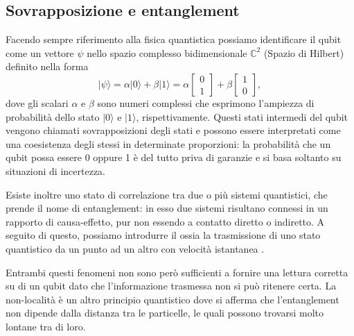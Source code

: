 \subsection{Sovrapposizione e entanglement}
Facendo sempre riferimento alla fisica quantistica possiamo identificare il qubit come un vettore $\psi$ nello spazio complesso bidimensionale $\mathbb{C}^2$ (Spazio di Hilbert) definito nella forma
\begin{equation}
    |\psi\rangle = \alpha|0\rangle + \beta|1\rangle =
    \alpha
    \begin{bmatrix}
        0\\
        1
    \end{bmatrix} +
    \beta
    \begin{bmatrix}
        1\\
        0
    \end{bmatrix},
\end{equation}
dove gli scalari $\alpha$ e $\beta$ sono numeri complessi che esprimono l'ampiezza di probabilità dello stato $|0\rangle$ e $|1\rangle$, rispettivamente.
Questi stati intermedi del qubit vengono chiamati sovrapposizioni degli stati e possono essere interpretati come una coesistenza degli stessi in determinate proporzioni: la probabilità che un qubit possa essere 0 oppure 1 è del tutto priva di garanzie e si basa soltanto su situazioni di incertezza.

Esiste inoltre uno stato di correlazione tra due o più sistemi quantistici, che prende il nome di entanglement: in esso due sistemi risultano connessi in un rapporto di causa-effetto, pur non essendo a contatto diretto o indiretto.
A seguito di questo, possiamo introdurre il  ossia la trasmissione di uno stato quantistico da un punto ad un altro con velocità istantanea \cite{cambridge2010book}.

Entrambi questi fenomeni non sono però sufficienti a fornire una lettura corretta su di un qubit dato che l'informazione trasmessa non si può ritenere certa.
La non-località è un altro principio quantistico dove si afferma che l'entanglement non dipende dalla distanza tra le particelle, le quali possono trovarsi molto lontane tra di loro.

